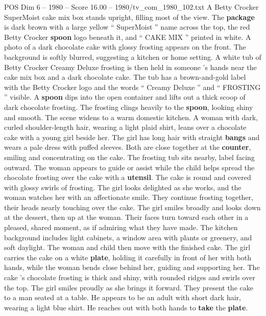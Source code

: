 \begin{textsample}{POS Dim 6 – 1980 – Score 16.00 – 1980/tv\_com\_1980\_102.txt}  \label{ex:f6_pos_032}
A Betty Crocker SuperMoist cake mix box stands upright, filling most of the view.
The \textbf{package} is dark brown with a large yellow “ SuperMoist ” name across the top, the red Betty Crocker \textbf{spoon} logo beneath it, and “ CAKE MIX ” printed in white.
A photo of a dark chocolate cake with glossy frosting appears on the front.
The background is softly blurred, suggesting a kitchen or home setting.
A white tub of Betty Crocker Creamy Deluxe frosting is then held in someone ’s hands near the cake mix box and a dark chocolate cake.
The tub has a brown-and-gold label with the Betty Crocker logo and the words “ Creamy Deluxe ” and “ FROSTING ” visible.
A \textbf{spoon} dips into the open container and lifts out a thick scoop of dark chocolate frosting.
The frosting clings heavily to the \textbf{spoon}, looking shiny and smooth.
The scene widens to a warm domestic kitchen.
A woman with dark, curled shoulder-length hair, wearing a light plaid shirt, leans over a chocolate cake with a young girl beside her.
The girl has long hair with straight \textbf{bangs} and wears a pale dress with puffed sleeves.
Both are close together at the \textbf{counter}, smiling and concentrating on the cake.
The frosting tub sits nearby, label facing outward.
The woman appears to guide or assist while the child helps spread the chocolate frosting over the cake with a \textbf{utensil}.
The cake is round and covered with glossy swirls of frosting.
The girl looks delighted as she works, and the woman watches her with an affectionate smile.
They continue frosting together, their heads nearly touching over the cake.
The girl smiles broadly and looks down at the dessert, then up at the woman.
Their faces turn toward each other in a pleased, shared moment, as if admiring what they have made.
The kitchen background includes light cabinets, a window area with plants or greenery, and soft daylight.
The woman and child then move with the finished cake.
The girl carries the cake on a white \textbf{plate}, holding it carefully in front of her with both hands, while the woman bends close behind her, guiding and supporting her.
The cake ’s chocolate frosting is thick and shiny, with rounded ridges and swirls over the top.
The girl smiles proudly as she brings it forward.
They present the cake to a man seated at a table.
He appears to be an adult with short dark hair, wearing a light blue shirt.
He reaches out with both hands to \textbf{take} the \textbf{plate}.

\end{textsample}
